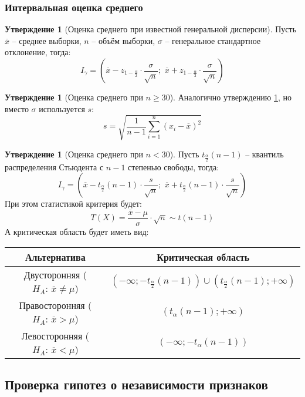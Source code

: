\documentclass[12pt]{article}
\theoremstyle{definition}
\newtheorem{statement}[theorem]{Утверждение}
\begin{document}
\subsubsection{Интервальная оценка среднего}
\begin{statement}[Оценка среднего при известной генеральной дисперсии]\label{Оценка среднего с дисперсией}
    Пусть $\overline{x}$ – среднее выборки, $n$ – объём выборки, $\sigma$ – генеральное стандартное отклонение, тогда:
    $$I_\gamma=\left(\overline{x}-z_{1-\frac{\alpha}{2}}\cdot\frac{\sigma}{\sqrt{n}};\,\,\overline{x}+z_{1-\frac{\alpha}{2}}\cdot\frac{\sigma}{\sqrt{n}}\right)$$
\end{statement}
\begin{statement}[Оценка среднего при $n\geq30$]
    Аналогично утверждению \ref{Оценка среднего с дисперсией}, но вместо $\sigma$ используется $s$:
    $$s=\sqrt{\frac{1}{n-1}\sum_{i=1}^{n}(x_i-\overline{x})^2}$$
\end{statement}
\renewcommand{\arraystretch}{1.5}
\begin{statement}[Оценка среднего при $n<30$]
    Пусть $t_{\frac{\alpha}{2}}(n-1)$ – квантиль распределения Стьюдента с $n-1$ степенью свободы, тогда:
    $$I_\gamma=\left(\overline{x}-t_{\frac{\alpha}{2}}(n-1)\cdot\frac{s}{\sqrt{n}};\,\,\overline{x}+t_{\frac{\alpha}{2}}(n-1)\cdot\frac{s}{\sqrt{n}}\right)$$
    При этом статистикой критерия будет:
    $$T(X)=\dfrac{\overline{x}-\mu}{\sigma}\cdot\sqrt{n}\sim t(n-1)$$
    А критическая область будет иметь вид:
    \begin{center}
        \begin{tabular}{c|c}
            Альтернатива & Критическая область \\
            \hline
            Двусторонняя ($H_A:\,\overline{x}\neq\mu$) & $(-\infty;-t_{\frac{\alpha}{2}}(n-1))\cup(t_{\frac{\alpha}{2}}(n-1);+\infty)$\\
            Правосторонняя ($H_A:\,\overline{x}>\mu$) & $(t_\alpha(n-1);+\infty)$\\
            Левосторонняя ($H_A:\,\overline{x}<\mu$) & $(-\infty;-t_\alpha(n-1))$
        \end{tabular}
    \end{center}
\end{statement}

\subsection{Проверка гипотез о независимости признаков}
\end{document}
